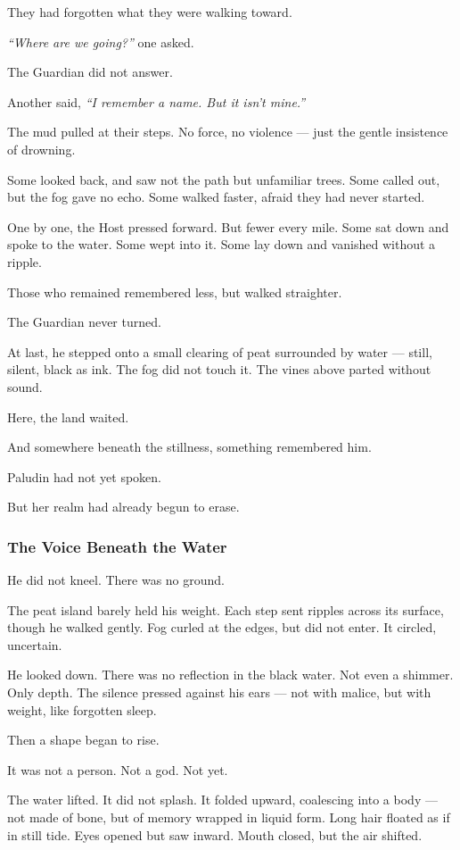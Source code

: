 \documentclass[12pt]{article}
\begin{document}
They had forgotten what they were walking toward.

\textit{``Where are we going?''} one asked.

The Guardian did not answer.

Another said, \textit{``I remember a name. But it isn't mine.''}

The mud pulled at their steps. No force, no violence — just the gentle insistence of drowning.

Some looked back, and saw not the path but unfamiliar trees. Some called out, but the fog gave no echo. Some walked faster, afraid they had never started.

One by one, the Host pressed forward. But fewer every mile. Some sat down and spoke to the water. Some wept into it. Some lay down and vanished without a ripple.

Those who remained remembered less, but walked straighter.

The Guardian never turned.

At last, he stepped onto a small clearing of peat surrounded by water — still, silent, black as ink. The fog did not touch it. The vines above parted without sound.

Here, the land waited.

And somewhere beneath the stillness, something remembered him.

Paludin had not yet spoken.

But her realm had already begun to erase.

\dotfill

\subsubsection*{The Voice Beneath the Water}

He did not kneel. There was no ground.

The peat island barely held his weight. Each step sent ripples across its surface, though he walked gently. Fog curled at the edges, but did not enter. It circled, uncertain.

He looked down. There was no reflection in the black water. Not even a shimmer. Only depth. The silence pressed against his ears — not with malice, but with weight, like forgotten sleep.

Then a shape began to rise.

It was not a person. Not a god. Not yet.

The water lifted. It did not splash. It folded upward, coalescing into a body — not made of bone, but of memory wrapped in liquid form. Long hair floated as if in still tide. Eyes opened but saw inward. Mouth closed, but the air shifted.
\end{document}
